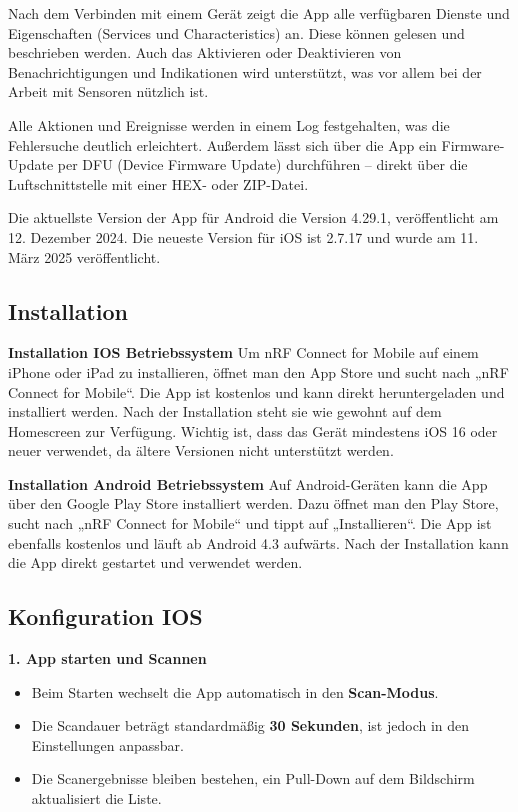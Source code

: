 Nach dem Verbinden mit einem Gerät zeigt die App alle verfügbaren Dienste und Eigenschaften (Services und Characteristics) an. Diese können gelesen und beschrieben werden. Auch das Aktivieren oder Deaktivieren von Benachrichtigungen und Indikationen wird unterstützt, was vor allem bei der Arbeit mit Sensoren nützlich ist.
\cite{Nordic:Mobile}

\vspace{1\baselineskip}

Alle Aktionen und Ereignisse werden in einem Log festgehalten, was die Fehlersuche deutlich erleichtert. Außerdem lässt sich über die App ein Firmware-Update per DFU (Device Firmware Update) durchführen – direkt über die Luftschnittstelle mit einer HEX- oder ZIP-Datei.
\cite{Nordic:Mobile}

\vspace{1\baselineskip}

Die aktuellste Version der App für Android die Version 4.29.1, veröffentlicht am 12. Dezember 2024. Die neueste Version für iOS ist 2.7.17 und wurde am 11. März 2025 veröffentlicht.
\cite{Nordic:Mobile:Apple}
\cite{Nordic:Mobile:Android}


\subsection{Installation}
\textbf{Installation IOS Betriebssystem}
Um nRF Connect for Mobile auf einem iPhone oder iPad zu installieren, öffnet man den App Store und sucht nach „nRF Connect for Mobile“. Die App ist kostenlos und kann direkt heruntergeladen und installiert werden. Nach der Installation steht sie wie gewohnt auf dem Homescreen zur Verfügung. Wichtig ist, dass das Gerät mindestens iOS 16 oder neuer verwendet, da ältere Versionen nicht unterstützt werden.
\cite{Nordic:Mobile:Apple}

\vspace{1\baselineskip}

\textbf{Installation Android Betriebssystem}
Auf Android-Geräten kann die App über den Google Play Store installiert werden. Dazu öffnet man den Play Store, sucht nach „nRF Connect for Mobile“ und tippt auf „Installieren“. Die App ist ebenfalls kostenlos und läuft ab Android 4.3 aufwärts. Nach der Installation kann die App direkt gestartet und verwendet werden.
\cite{Nordic:Mobile:Android}

\subsection{Konfiguration IOS}
\textbf{1. App starten und Scannen}
\begin{itemize}
    \item Beim Starten wechselt die App automatisch in den \textbf{Scan-Modus}.
    
    \item Die Scandauer beträgt standardmäßig \textbf{30 Sekunden}, ist jedoch in den Einstellungen anpassbar.
    
    \item Die Scanergebnisse bleiben bestehen, ein Pull-Down auf dem Bildschirm aktualisiert die Liste.
\end{itemize}
\cite{Nordic:2018:Apple}

